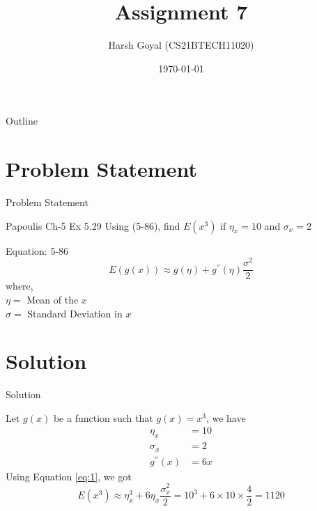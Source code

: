 \documentclass{beamer}
\title{Assignment 7}
\author{Harsh Goyal (CS21BTECH11020)}
\date{\today}
\begin{document}
\begin{frame}
    \titlepage 
\end{frame}

\logo{}


\begin{frame}{Outline}
    \tableofcontents
\end{frame}


\section{Problem Statement}
\begin{frame}{Problem Statement}
    \begin{block}{Papoulis Ch-5 Ex 5.29}
        Using (5-86), find $E(x^3)$ if $\eta_x =10 $ and $ \sigma_x = 2$
    \end{block}
    \begin{alertblock}{Equation: 5-86}
       \begin{equation}
        E(g(x)) \approx g(\eta) + g^{''}(\eta)\frac{\sigma^2}{2} \label{eq:1}
       \end{equation}
       where, \\
       $\eta = $ Mean of the $x$ \\
       $\sigma = $ Standard Deviation in $x$
    \end{alertblock}
\end{frame}


\section{Solution}
\begin{frame}{Solution}
    \begin{block}{}
        Let $g(x)$ be a function such that $g(x) = x^3$,
        we have \\
        \begin{align}
            \eta_x &= 10 \\
            \sigma_x &= 2 \\
            g^{''}(x) &= 6x 
        \end{align}
        Using Equation \eqref{eq:1}, we got
        \begin{equation}
            E(x^3) \approx \eta_x^3 + 6 \eta_x  \frac{\sigma_x^2}{2} = 10^3+6\times 10 \times \frac{4}{2} = 1120
        \end{equation}
        
    \end{block}
\end{frame} 
\end{document}
